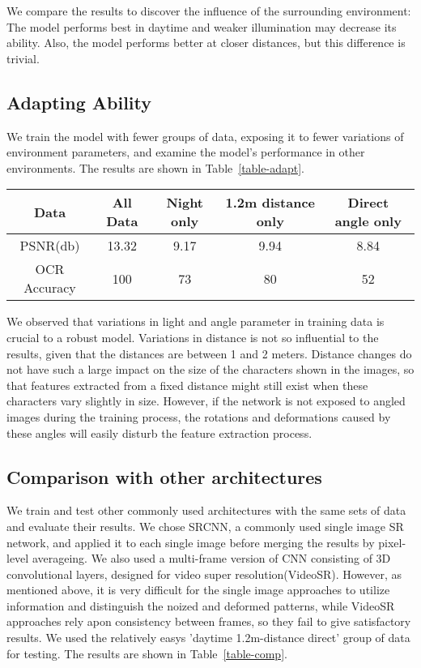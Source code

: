 We compare the results to discover the influence of the surrounding environment: The model performs best in daytime and weaker illumination may decrease its ability. Also, the model performs better at closer distances, but this difference is trivial.

\subsection{Adapting Ability}
We train the model with fewer groups of data, exposing it to fewer variations of environment parameters, and examine the model’s performance in other environments. The results are shown in Table~\ref{table-adapt}.

\begin{table*}  
\begin{tabular}{c|c|c|c|c} 
Data & All Data & Night only & 1.2m distance only & Direct angle only \\ \hline
PSNR(db) & 13.32 & 9.17 & 9.94 & 8.84\\ \hline
OCR Accuracy & 100 & 73 & 80 & 52\\
\end{tabular} 
\caption{Adapting Ability}
\label{table-adapt}
\end{table*}

We observed that variations in light and angle parameter in training data is crucial to a robust model. Variations in distance is not so influential to the results, given that the distances are between 1 and 2 meters. Distance changes do not have such a large impact on the size of the characters shown in the images, so that features extracted from a fixed distance might still exist when these characters vary slightly in size. However, if the network is not exposed to angled images during the training process, the rotations and deformations caused by these angles will easily disturb the feature extraction process.

\subsection{Comparison with other architectures}
We train and test other commonly used architectures with the same sets of data and evaluate their results. We chose SRCNN, a commonly used single image SR network, and applied it to each single image before merging the results by pixel-level averageing. We also used a multi-frame version of CNN consisting of 3D convolutional layers, designed for video super resolution(VideoSR). However, as mentioned above, it is very difficult for the single image approaches to utilize information and distinguish the noized and deformed patterns, while VideoSR approaches rely apon consistency between frames, so they fail to give satisfactory results. We used the relatively easys 'daytime 1.2m-distance direct' group of data for testing. The results are shown in Table~\ref{table-comp}.

